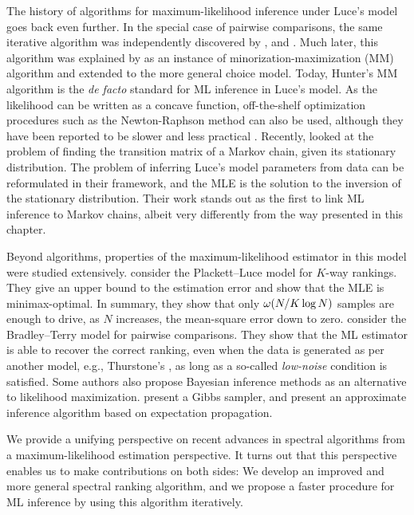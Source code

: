 The history of algorithms for maximum-likelihood inference under Luce's model goes back even further.
In the special case of pairwise comparisons, the same iterative algorithm was independently discovered by \citet{zermelo1928berechnung}, \citet{ford1957solution} and \citet{dykstra1960rank}.
Much later, this algorithm was explained by \citet{hunter2004mm} as an instance of minorization-maximization (MM) algorithm and extended to the more general choice model.
Today, Hunter's MM algorithm is the \emph{de facto} standard for ML inference in Luce's model.
As the likelihood can be written as a concave function, off-the-shelf optimization procedures such as the Newton-Raphson method can also be used, although they have been reported to be slower and less practical \citep{hunter2004mm}.
Recently, \citet{kumar2015inverting} looked at the problem of finding the transition matrix of a Markov chain, given its stationary distribution.
The problem of inferring Luce's model parameters from data can be reformulated in their framework, and the MLE is the solution to the inversion of the stationary distribution.
Their work stands out as the first to link ML inference to Markov chains, albeit very differently from the way presented in this chapter.

Beyond algorithms, properties of the maximum-likelihood estimator in this model were studied extensively.
\citet{hajek2014minimax} consider the Plackett--Luce model for $K$-way rankings.
They give an upper bound to the estimation error and show that the MLE is minimax-optimal.
In summary, they show that only $\omega(N/K \log N)$ samples are enough to drive, as $N$ increases, the mean-square error down to zero.
\citet{rajkumar2014statistical} consider the Bradley--Terry model for pairwise comparisons.
They show that the ML estimator is able to recover the correct ranking, even when the data is generated as per another model, e.g., Thurstone's \citep{thurstone1927method}, as long as a so-called \emph{low-noise} condition is satisfied.
Some authors also propose Bayesian inference methods as an alternative to likelihood maximization.
\citet{caron2012efficient} present a Gibbs sampler, and \citet{guiver2009bayesian} present an approximate inference algorithm based on expectation propagation.

We provide a unifying perspective on recent advances in spectral algorithms \citep{negahban2012iterative, azari2013generalized} from a maximum-likelihood estimation perspective.
It turns out that this perspective enables us to make contributions on both sides:
We develop an improved and more general spectral ranking algorithm, and we propose a faster procedure for ML inference by using this algorithm iteratively.

